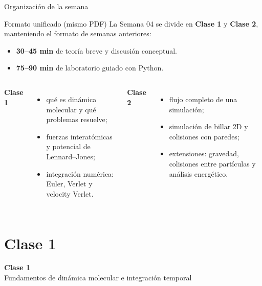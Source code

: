 




\frame{\titlepage}

\begin{frame}{Organización de la semana}
\begin{block}{Formato unificado (mismo PDF)}
La Semana 04 se divide en \textbf{Clase 1} y \textbf{Clase 2}, manteniendo el formato de semanas anteriores:
\begin{itemize}
    \item \textbf{30--45 min} de teoría breve y discusión conceptual.
    \item \textbf{75--90 min} de laboratorio guiado con Python.
\end{itemize}
\end{block}

\vspace{0.3cm}
\begin{columns}[T,onlytextwidth]
\textbf{Clase 1}
\begin{itemize}
    \item qué es dinámica molecular y qué problemas resuelve;
    \item fuerzas interatómicas y potencial de Lennard--Jones;
    \item integración numérica: Euler, Verlet y velocity Verlet.
\end{itemize}
\textbf{Clase 2}
\begin{itemize}
    \item flujo completo de una simulación;
    \item simulación de billar 2D y colisiones con paredes;
    \item extensiones: gravedad, colisiones entre partículas y análisis energético.
\end{itemize}
\end{columns}
\end{frame}

\section{Clase 1}

\begin{frame}[plain]
\centering
\vfill
{\Huge \bfseries Clase 1}\\[0.4cm]
{\Large Fundamentos de dinámica molecular e integración temporal}
\vfill
\end{frame}

